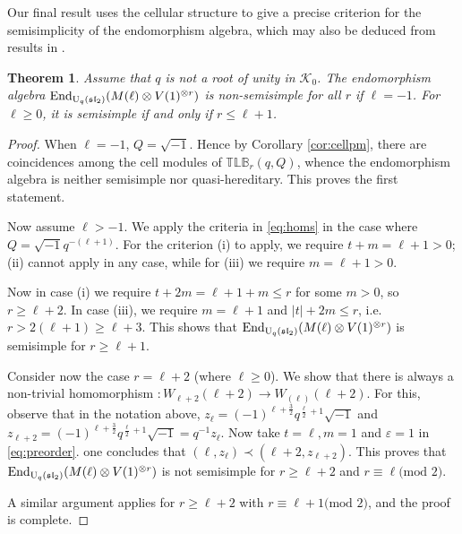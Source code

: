 \documentclass[12pt]{amsart}
\newtheorem{theorem}{Theorem}[section]
\theoremstyle{definition}
\theoremstyle{remark}
\numberwithin{equation}{section}
\newcommand{\CK}{{\mathcal K}}
\newcommand{\inv}{^{-1}}
\newcommand{\lr}{\longrightarrow}
\newcommand{\U}{{\rm{U}}}
\newcommand{\End}{{\rm{End}}}
\newcommand{\fsl}{{\mathfrak {sl}}}
\newcommand{\ot}{\otimes}
\newcommand{\ve}{{\varepsilon}}
\newcommand{\TLBB}{{\mathbb{TLB}}}
\begin{document}
Our final result uses the cellular structure to give a precise criterion for the semisimplicity of the endomorphism algebra, 
which may also be deduced from results in \cite{BS3}.

\begin{theorem}\label{thm:ss} Assume that $q$ is not a root of unity in $\CK_0$.
The endomorphism algebra $\End_{\U_q(\fsl_2)}(M(\ell)\ot V(1)^{\ot r})$ is non-semisimple for all $r$ if $\ell=-1$.
For $\ell\geq 0$, it is semisimple if and only if $r\leq\ell+1$. 
\end{theorem}
\begin{proof}
When $\ell=-1$, $Q=\sqrt{-1}$. Hence by Corollary \ref{cor:cellpm}, there are coincidences among the
cell modules of $\TLBB_r(q,Q)$, whence the endomorphism algebra is neither semisimple nor quasi-hereditary. 
This proves the first statement.

Now assume $\ell>-1$. We apply the criteria in \eqref{eq:homs} in the case where $Q=\sqrt{-1}q^{-(\ell+1)}$.
For the criterion (i) to apply, we require $t+m=\ell+1>0$; (ii) cannot apply in any case, while for 
(iii) we require $m=\ell+1>0$. 

Now in case (i) we require $t+2m=\ell+1+m\leq r$ for some $m>0$, so $r\geq \ell+2$.
In case (iii), we require $m=\ell+1$ and $|t|+2m\leq r$, i.e. $r> 2(\ell+1)\geq \ell+3$.  
This shows that $\End_{\U_q(\fsl_2)}(M(\ell)\ot V(1)^{\ot r})$ is semisimple for $r\geq\ell+1$.

Consider now the case $r=\ell+2$ (where $\ell\geq 0$). We show that there is always a non-trivial homomorphism 
$:W_{\ell+2}(\ell+2)\lr W_{(\ell)}(\ell+2)$. For this, observe that in the notation above,
 $z_\ell=(-1)^{\ell+\frac{3}{2}}q^{\frac{\ell}{2}+1}\sqrt{-1}$ and 
 $z_{\ell+2}=(-1)^{\ell+\frac{3}{2}}q^{\frac{\ell}{2}+1}\sqrt{-1}=q\inv z_\ell$.
 Now take $t=\ell,m=1$ and $\ve=1$ in \eqref{eq:preorder}. one concludes that $(\ell,z_\ell)\prec(\ell+2,z_{\ell+2})$.
 This proves that $\End_{\U_q(\fsl_2)}(M(\ell)\ot V(1)^{\ot r})$ is not semisimple for $r\geq \ell +2$ and $r\equiv\ell\text{(mod }2)$.
 
 A similar argument applies for $r\geq\ell+2$ with $r\equiv\ell+1\text{(mod }2)$, and the proof is complete.
\end{proof}
\end{document}
